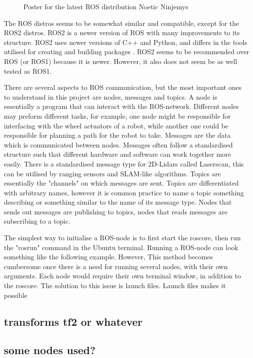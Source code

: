 \begin{figure}[H]
\centering

  \caption{Poster for the latest ROS distribution Noetic Ninjemys \cite{ROSLogo}}
  \label{fig:noeticLogo}
\end{figure}

The ROS distros seems to be somewhat similar and compatible, except for the ROS2 distros. ROS2 is a newer version of ROS with many improvements to its structure. ROS2 uses newer versions of C++ and Python, and differs in the tools utilised for creating and building packages \cite{ROSChanges}. ROS2 seems to be recommended over ROS (or ROS1) because it is newer. However, it also does not seem be as well tested as ROS1.

There are several aspects to ROS communication, but the most important ones to understand in this project are nodes, messages and topics. A node is essentially a program that can interact with the ROS-network. Different nodes may preform different tasks, for example, one node might be responsible for interfacing with the wheel actuators of a robot, while another one could be responsible for planning a path for the robot to take. Messages are the data which is communicated between nodes. Messages often follow a standardised structure such that different hardware and software can work together more easily. There is a standardised message type for 2D-Lidars called Laserscan, this can be utilised by ranging sensors and SLAM-like algorithms.  Topics are essentially the "channels" on which messages are sent. Topics are differentiated with arbitrary names, however it is common practice to name a topic something describing or something similar to the name of its message type. Nodes that sends out messages are publishing to topics, nodes that reads messages are subscribing to a topic. 

The simplest way to initialise a ROS-node is to first start the roscore, then run the "rosrun" command in the Ubuntu terminal. Running a ROS-node can look something like the following example.  
However, This method becomes cumbersome once there is a need for running several nodes, with their own arguments. Each node would require their own terminal window, in addition to the roscore. The solution to this issue is launch files. Launch files makes it possible 

\subsection{transforms tf2 or whatever}
\subsection{some nodes used?}